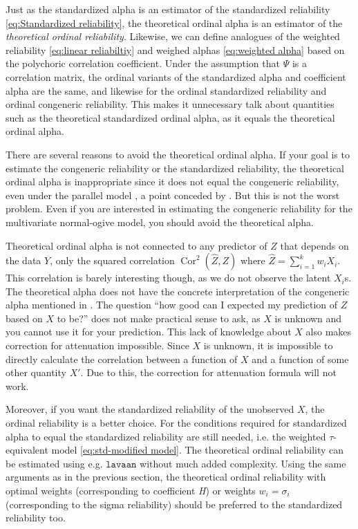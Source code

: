 \documentclass[twoside]{article}
\DeclareMathOperator{\Cor}{Cor}
\begin{document}
Just as the standardized alpha is an estimator of the standardized reliability \cref{eq:Standardized reliability}, the theoretical ordinal alpha is an estimator of the \textit{theoretical ordinal reliability}. Likewise, we can define
analogues of the weighted reliability \eqref{eq:linear reliabiltiy} and weighed alphas \eqref{eq:weighted alpha} based on the polychoric correlation coefficient.
Under the assumption that $\Psi$ is a correlation matrix, the ordinal variants of the standardized alpha and coefficient alpha are the same, and likewise for the ordinal standardized reliability and ordinal congeneric reliability. This makes it unnecessary talk about quantities such as the theoretical standardized ordinal alpha, as it equals the theoretical ordinal alpha. 

There are several reasons to avoid the theoretical ordinal alpha. If your
goal is to estimate the congeneric reliability or the standardized
reliability, the theoretical ordinal alpha is inappropriate since
it does not equal the congeneric reliability, even under the parallel
model \citep[p. 1062, "Misconception 2"]{Chalmers2018-fj}, a point
conceded by \citet{Zumbo2019-lm}. But this is not the worst problem.
Even if you are interested in estimating the congeneric reliability
for the multivariate normal-ogive model, you should avoid the theoretical
alpha.

Theoretical ordinal alpha is not connected to any predictor
of $Z$ that depends on the data $Y$, only the squared correlation $\Cor^{2}(\hat{Z},Z)$ where $\hat{Z}=\sum_{i=1}^k w_iX_i$. This correlation is barely interesting though, as we do not observe
the latent $X_{i}$s. The theoretical alpha does not have the concrete
interpretation of the congeneric alpha mentioned in . The question
``how good can I expected my prediction of $Z$ based on $X$ to
be?'' does not make practical sense to ask, as $X$ is unknown and you cannot use it for your prediction. This
lack of knowledge about $X$ also makes correction for attenuation
impossible. Since $X$ is unknown, it is impossible to directly calculate
the correlation between a function of $X$ and a function of some
other quantity $X'$. Due to this, the correction for attenuation formula
will not work. 

Moreover, if you want the standardized reliability of the unobserved
$X$, the ordinal reliability is a better choice. For the conditions
required for standardized alpha to equal the standardized reliability
are still needed, i.e. the weighted $\tau$-equivalent model \eqref{eq:std-modified model}. The
theoretical ordinal reliability can be estimated using e.g. $\mathtt{lavaan}$
without much added complexity. Using the same arguments as in the
previous section, the theoretical ordinal reliability with optimal
weights (corresponding to coefficient \textit{H}) or weights $w_{i}=\sigma_{i}$
(corresponding to the sigma reliability) should be preferred to the
standardized reliability too.
\end{document}
